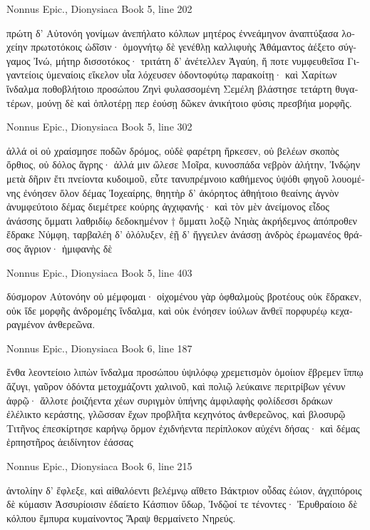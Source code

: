 \documentclass[12pt,letterpaper,twoside,final]{memoir}
\begin{document}
\begin{greek}
Nonnus Epic., Dionysiaca 
Book 5, line 202

πρώτη δ' Αὐτονόη γονίμων ἀνεπήλατο κόλπων 
μητέρος ἐννεάμηνον ἀναπτύξασα λοχείην 
πρωτοτόκοις ὠδῖσιν· ὁμογνήτῳ δὲ γενέθλῃ 
καλλιφυὴς Ἀθάμαντος ἀέξετο σύγγαμος Ἰνώ, 
μήτηρ δισσοτόκος· τριτάτη δ' ἀνέτελλεν Ἀγαύη, 
ἥ ποτε νυμφευθεῖσα Γιγαντείοις ὑμεναίοις 
εἴκελον υἷα λόχευσεν ὀδοντοφύτῳ παρακοίτῃ· 
καὶ Χαρίτων ἴνδαλμα ποθοβλήτοιο προσώπου 
Ζηνὶ φυλασσομένη Σεμέλη βλάστησε τετάρτη 
θυγατέρων, μούνῃ δὲ καὶ ὁπλοτέρῃ περ ἐούσῃ 
δῶκεν ἀνικήτοιο φύσις πρεσβήια μορφῆς. 



Nonnus Epic., Dionysiaca 
Book 5, line 302

ἀλλά οἱ οὐ χραίσμησε ποδῶν δρόμος, οὐδὲ φαρέτρη 
ἤρκεσεν, οὐ βελέων σκοπὸς ὄρθιος, οὐ δόλος ἄγρης· 
ἀλλά μιν ὤλεσε Μοῖρα, κυνοσπάδα νεβρὸν ἀλήτην, 
Ἰνδῴην μετὰ δῆριν ἔτι πνείοντα κυδοιμοῦ, 
εὖτε τανυπρέμνοιο καθήμενος ὑψόθι φηγοῦ 
λουομένης ἐνόησεν ὅλον δέμας Ἰοχεαίρης, 
θηητὴρ δ' ἀκόρητος ἀθηήτοιο θεαίνης 
ἁγνὸν ἀνυμφεύτοιο δέμας διεμέτρεε κούρης 
ἀγχιφανής· καὶ τὸν μὲν ἀνείμονος εἶδος ἀνάσσης 
ὄμματι λαθριδίῳ δεδοκημένον † ὄμματι λοξῷ 
Νηιὰς ἀκρήδεμνος ἀπόπροθεν ἔδρακε Νύμφη, 
ταρβαλέη δ' ὀλόλυξεν, ἑῇ δ' ἤγγειλεν ἀνάσσῃ 
ἀνδρὸς ἐρωμανέος θράσος ἄγριον· ἡμιφανὴς δὲ 




Nonnus Epic., Dionysiaca 
Book 5, line 403

δύσμορον Αὐτονόην οὐ μέμφομαι· οἰχομένου γὰρ 
ὀφθαλμοὺς βροτέους οὐκ ἔδρακεν, οὐκ ἴδε μορφῆς 
ἀνδρομέης ἴνδαλμα, καὶ οὐκ ἐνόησεν ἰούλων 
ἄνθεϊ πορφυρέῳ κεχαραγμένον ἀνθερεῶνα. 



Nonnus Epic., Dionysiaca 
Book 6, line 187

ἔνθα λεοντείοιο λιπὼν ἴνδαλμα προσώπου 
ὑψιλόφῳ χρεμετισμὸν ὁμοίιον ἔβρεμεν ἵππῳ 
ἄζυγι, γαῦρον ὀδόντα μετοχμάζοντι χαλινοῦ, 
καὶ πολιῷ λεύκαινε περιτρίβων γένυν ἀφρῷ· 
ἄλλοτε ῥοιζήεντα χέων συριγμὸν ὑπήνης 
ἀμφιλαφὴς φολίδεσσι δράκων ἐλέλικτο κεράστης, 
γλῶσσαν ἔχων προβλῆτα κεχηνότος ἀνθερεῶνος, 
καὶ βλοσυρῷ Τιτῆνος ἐπεσκίρτησε καρήνῳ 
ὅρμον ἐχιδνήεντα περίπλοκον αὐχένι δήσας· 
καὶ δέμας ἑρπηστῆρος ἀειδίνητον ἐάσσας 




Nonnus Epic., Dionysiaca 
Book 6, line 215

ἀντολίην δ' ἔφλεξε, καὶ αἰθαλόεντι βελέμνῳ 
αἴθετο Βάκτριον οὖδας ἑώιον, ἀγχιπόροις δὲ 
κύμασιν Ἀσσυρίοισιν ἐδαίετο Κάσπιον ὕδωρ, 
Ἰνδῷοί τε τένοντες· Ἐρυθραίοιο δὲ κόλπου 
ἔμπυρα κυμαίνοντος Ἄραψ θερμαίνετο Νηρεύς. 




\end{greek}
\end{document}

